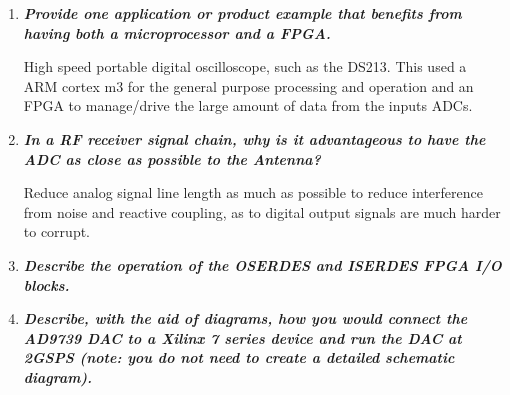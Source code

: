 \documentclass[11pt]{article}
\begin{document}
\begin{preview}
\begin{enumerate}
    \item \textit{\textbf{Provide one application or product example that benefits from having both a microprocessor and a FPGA.}}
    
    High speed portable digital oscilloscope, such as the DS213. This used a ARM cortex m3 for the general purpose processing and operation and an FPGA to manage/drive the large amount of data from the inputs ADCs.

    \item \textit{\textbf{In a RF receiver signal chain, why is it advantageous to have the ADC as close as possible to the Antenna?}}
    
    Reduce analog signal line length as much as possible to reduce interference from noise and reactive coupling, as to digital output signals are much harder to corrupt.

    \item \textit{\textbf{Describe the operation of the OSERDES and ISERDES FPGA I/O blocks.}}
    
    

    \item \textit{\textbf{Describe, with the aid of diagrams, how you would connect the AD9739 DAC to a Xilinx 7 series device and run the DAC at 2GSPS (note: you do not need to create a detailed schematic diagram).}}
    

\end{enumerate}

\end{preview}
\end{document}
